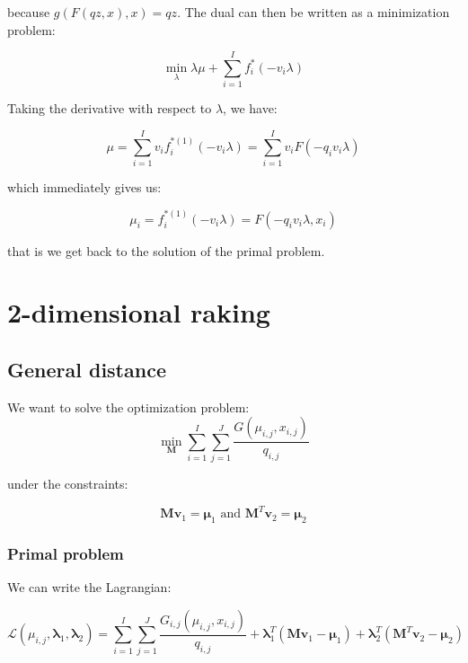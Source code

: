 \documentclass{tex/note}
\begin{document}
because $g \left( F \left( q z , x \right) , x \right) = q z$.  The dual can then be written as a minimization problem:

\begin{equation*}
\min_\lambda \lambda \mu + \sum_{i = 1}^I f_i^* \left( - v_i \lambda \right)
\end{equation*}

Taking the derivative with respect to $\lambda$, we have:

\begin{equation*}
\mu = \sum_{i = 1}^I v_i f_i^{* \left( 1 \right)} \left( - v_i \lambda \right) = \sum_{i = 1}^I v_i F \left( - q_i v_i \lambda \right)
\end{equation*}

which immediately gives us:

\begin{equation*}
\mu_i = f_i^{* \left( 1 \right)} \left( - v_i \lambda \right) = F \left( - q_i v_i \lambda , x_i \right)
\end{equation*}

that is we get back to the solution of the primal problem.

\section{2-dimensional raking}

\subsection{General distance}

We want to solve the optimization problem:
\begin{equation*}
\min_{\bm{M}} \sum_{i = 1}^I \sum_{j = 1}^J \frac{G \left( \mu_{i,j} , x_{i,j} \right)}{q_{i,j}}
\end{equation*}

under the constraints:

\begin{equation*}
\bm{M} \bm{v}_1 = \bm{\mu}_1 \text{ and } \bm{M}^T \bm{v}_2 = \bm{\mu}_2
\end{equation*}

\subsubsection{Primal problem}

We can write the Lagrangian:

\begin{equation*}
\mathcal{L} \left( \mu_{i,j} , \bm{\lambda}_1 , \bm{\lambda}_2 \right) = \sum_{i = 1}^I \sum_{j = 1}^J \frac{G_{i,j} \left( \mu_{i,j} , x_{i,j} \right)}{q_{i,j}} + \bm{\lambda}_1^T \left( \bm{M} \bm{v}_1 - \bm{\mu}_1 \right) + \bm{\lambda}_2^T \left( \bm{M}^T \bm{v}_2 - \bm{\mu}_2 \right)
\end{equation*}
\end{document}
